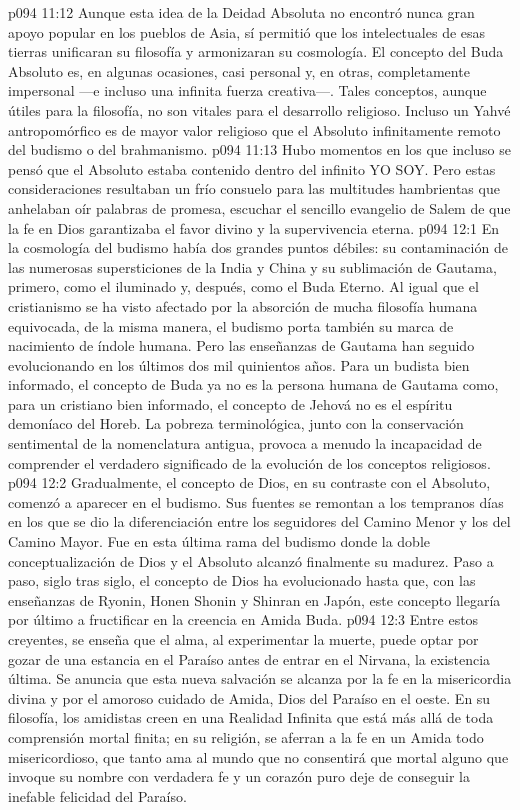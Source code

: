 \vs p094 11:12 \pc Aunque esta idea de la Deidad Absoluta no encontró nunca gran apoyo popular en los pueblos de Asia, sí permitió que los intelectuales de esas tierras unificaran su filosofía y armonizaran su cosmología. El concepto del Buda Absoluto es, en algunas ocasiones, casi personal y, en otras, completamente impersonal ---e incluso una infinita fuerza creativa---. Tales conceptos, aunque útiles para la filosofía, no son vitales para el desarrollo religioso. Incluso un Yahvé antropomórfico es de mayor valor religioso que el Absoluto infinitamente remoto del budismo o del brahmanismo.
\vs p094 11:13 Hubo momentos en los que incluso se pensó que el Absoluto estaba contenido dentro del infinito YO SOY. Pero estas consideraciones resultaban un frío consuelo para las multitudes hambrientas que anhelaban oír palabras de promesa, escuchar el sencillo evangelio de Salem de que la fe en Dios garantizaba el favor divino y la supervivencia eterna.
\vs p094 12:1 En la cosmología del budismo había dos grandes puntos débiles: su contaminación de las numerosas supersticiones de la India y China y su sublimación de Gautama, primero, como el iluminado y, después, como el Buda Eterno. Al igual que el cristianismo se ha visto afectado por la absorción de mucha filosofía humana equivocada, de la misma manera, el budismo porta también su marca de nacimiento de índole humana. Pero las enseñanzas de Gautama han seguido evolucionando en los últimos dos mil quinientos años. Para un budista bien informado, el concepto de Buda ya no es la persona humana de Gautama como, para un cristiano bien informado, el concepto de Jehová no es el espíritu demoníaco del Horeb. La pobreza terminológica, junto con la conservación sentimental de la nomenclatura antigua, provoca a menudo la incapacidad de comprender el verdadero significado de la evolución de los conceptos religiosos.
\vs p094 12:2 \pc Gradualmente, el concepto de Dios, en su contraste con el Absoluto, comenzó a aparecer en el budismo. Sus fuentes se remontan a los tempranos días en los que se dio la diferenciación entre los seguidores del Camino Menor y los del Camino Mayor. Fue en esta última rama del budismo donde la doble conceptualización de Dios y el Absoluto alcanzó finalmente su madurez. Paso a paso, siglo tras siglo, el concepto de Dios ha evolucionado hasta que, con las enseñanzas de Ryonin, Honen Shonin y Shinran en Japón, este concepto llegaría por último a fructificar en la creencia en Amida Buda.
\vs p094 12:3 Entre estos creyentes, se enseña que el alma, al experimentar la muerte, puede optar por gozar de una estancia en el Paraíso antes de entrar en el Nirvana, la existencia última. Se anuncia que esta nueva salvación se alcanza por la fe en la misericordia divina y por el amoroso cuidado de Amida, Dios del Paraíso en el oeste. En su filosofía, los amidistas creen en una Realidad Infinita que está más allá de toda comprensión mortal finita; en su religión, se aferran a la fe en un Amida todo misericordioso, que tanto ama al mundo que no consentirá que mortal alguno que invoque su nombre con verdadera fe y un corazón puro deje de conseguir la inefable felicidad del Paraíso.
